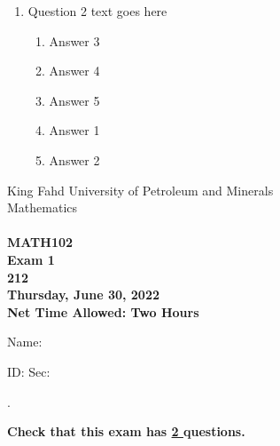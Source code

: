 \documentclass[amsfonts,bezier,leqno,fleqn,12pt,a4paper]{article}
\begin{document}
{\begin{large}
\begin{enumerate}
\begin{enumerate}
\end{enumerate}

\vspace {3.5cm}


\item Question 2 text goes here
\vspace {0.3in}
\setcounter{equation}{0}

\begin{enumerate}
\item  Answer 3
\item  Answer 4
\item  Answer 5
\item  Answer 1
\item  Answer 2

\end{enumerate}
\newpage


\end{enumerate}
\end{large}


\newpage


\thispagestyle{empty}
\begin{center}
    \begin{large}
        King Fahd University of Petroleum and Minerals \\ 
        Mathematics  \\ 
        \vspace*{4.5cm}
        {\bf {} }  \hfill {\bf {}} \\
        {\bf MATH102 }  \\
        {\bf Exam 1 }  \\
        {\bf 212 }  \\
        {\bf Thursday, June 30, 2022 }  \\ 
        {\bf Net Time Allowed: Two Hours }  \\
        \vspace*{0.2cm}

    \end{large}
\end{center}

\large{Name:  }\hrulefill

\vspace{3mm}

\large{ID: } \hrulefill \large{  Sec: } \hrulefill \large{.

\vspace{1cm}

\large{\bf{Check that this exam has {\underline{ 2 }} questions.}}

\vspace{1cm}

}}
\end{document}
